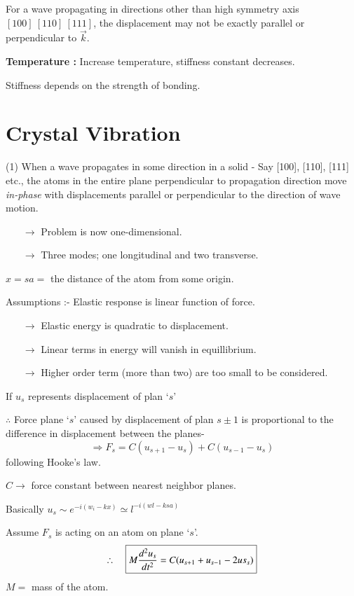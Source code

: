 For a wave propagating in directions other than high symmetry axis $[100] \ [110] \ [111]$, the displacement may not be exactly parallel or perpendicular to $\overrightarrow{k}$.

\medskip
\noindent
{\bf Temperature :} Increase temperature, stiffness constant decreases.

Stiffness depends on the strength of bonding.

\section*{Crystal Vibration}

(1) When a wave propagates in some direction in a solid - Say [100], [110], [111] etc., the atoms in the entire plane perpendicular to propagation direction move {\em in-phase} with displacements parallel or perpendicular to the direction of wave motion.
\begin{itemize}
\itemsep=0pt
\item[$\to$] Problem is now one-dimensional.

\item[$\to$] Three modes; one longitudinal and two transverse.
\end{itemize}
$x=sa=$ the distance of the atom from some origin.

Assumptions :- Elastic response is linear function of force.
\begin{itemize}
\itemsep=0pt
\item[$\to$] Elastic energy is quadratic to displacement.

\item[$\to$] Linear terms in energy will vanish in equillibrium.

\item[$\to$] Higher order term (more than two) are too small to be considered.
\end{itemize}
If $u_{s}$ represents displacement of plan `$s$'

\eject

$\therefore$ Force plane `$s$' caused by displacement of plan $s\pm 1$ is proportional to the difference in displacement between the planes-
$$
\Rightarrow F_{s}=C(u_{s+1}-u_{s})+C(u_{s-1}-u_{s})
$$
following Hooke's law.

$C\to$ force constant between nearest neighbor planes.

Basically $u_{s}\sim e^{-i(w_{i}-kx)}\simeq l^{-i(wl-ksa)}$

Assume $F_{s}$ is acting on an atom on plane `$s$'.
$$
\therefore\quad \fbox{$M\dfrac{d^{2}u_{s}}{dt^{2}}=C(u_{s+1}+u_{s-1}-2us_{s})$}
$$
$M=$ mass of the atom.

